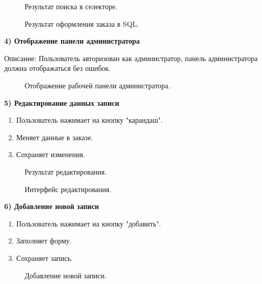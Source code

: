 \begin{figure}[ht]
	\caption{Результат поиска в селекторе.}
	\label{storedf:formsearch1}
\end{figure}

\begin{figure}[ht]
	\caption{Результат оформления заказа в SQL.}
	\label{storedf:formgg1}
\end{figure}
\clearpage

\textbf{4) Отображение панели администратора}

Описание: Пользователь авторизован как администратор, панель администратора должна отображаться без ошибок. 

\begin{figure}[ht]
	\caption{Отображение рабочей панели администратора.}
	\label{storedf:panel0_}
\end{figure}

\textbf{5) Редактирование данных записи}
\begin{enumerate}
\item Пользователь нажимает на кнопку "карандаш".
\item Меняет данные в заказе.
\item Сохраняет изменения.
\end{enumerate}

\begin{figure}[ht]
	\caption{Результат редактирования.}
	\label{storedf:edit1}
\end{figure}

\begin{figure}[ht]
	\caption{Интерфейс редактирования.}
	\label{stored:edit0}
\end{figure}

\clearpage

\textbf{6) Добавление новой записи}
\begin{enumerate}
	\item Пользователь нажимает на кнопку "добавить".
	\item Заполняет форму.
	\item Сохраняет запись.
\end{enumerate}

\begin{figure}[ht]
	\caption{Добавление новой записи.}
	\label{stored:addone}
\end{figure}

